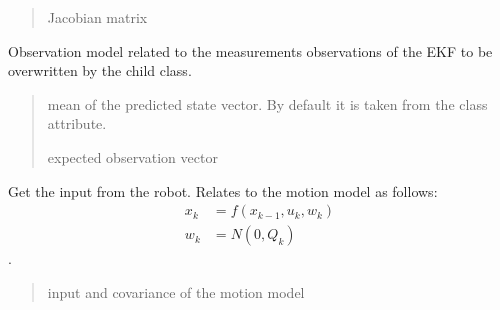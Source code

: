 \documentclass[letterpaper,10pt,english]{sphinxmanual}
\begin{document}
\begin{fulllineitems}
\begin{fulllineitems}
\begin{quote}
\begin{description}
\sphinxAtStartPar
Jacobian matrix

\end{description}\end{quote}

\end{fulllineitems}


\begin{fulllineitems}
\label{\detokenize{GFLocalization:EKF_3DOFDifferentialDriveCtVelocity.EKF_3DOFDifferentialDriveCtVelocity.hm}}
\pysigstartsignatures
{}
\pysigstopsignatures
\sphinxAtStartPar
Observation model related to the measurements observations of the EKF to be overwritten by the child class.
\begin{quote}\begin{description}
\sphinxAtStartPar
{} \textendash{} mean of the predicted state vector. By default it is taken from the class attribute.

\sphinxAtStartPar
expected observation vector

\end{description}\end{quote}

\end{fulllineitems}


\begin{fulllineitems}
\label{\detokenize{GFLocalization:EKF_3DOFDifferentialDriveCtVelocity.EKF_3DOFDifferentialDriveCtVelocity.GetInput}}
\pysigstartsignatures
{}
\pysigstopsignatures
\sphinxAtStartPar
Get the input from the robot. Relates to the motion model as follows:
\begin{equation}\label{equation:GFLocalization:eq-f-GFLocalization}
\begin{split}x_k &= f(x_{k-1},u_k,w_k) \\
w_k &= N(0,Q_k)\end{split}
\end{equation}
\sphinxAtStartPar
{} .
\begin{quote}\begin{description}
\sphinxAtStartPar
input and covariance of the motion model


\end{description}
\end{quote}
\end{fulllineitems}
\end{fulllineitems}
\end{document}
